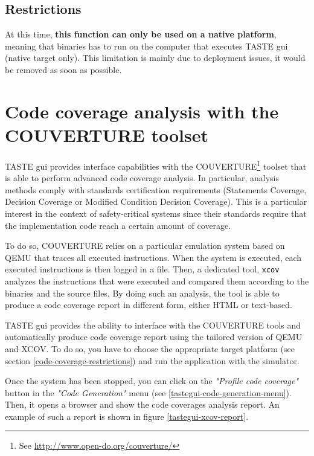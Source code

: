 \documentclass[11pt]{book}
\begin{document}
      \subsection{Restrictions}
      At this time, \textbf{this function can only be used on a native platform}, meaning
      that binaries has to run on the computer that executes TASTE gui (native
      target only). This limitation is mainly due to deployment issues, it would be removed as
      soon as possible.


   \section{Code coverage analysis with the COUVERTURE toolset}
   TASTE gui provides interface capabilities with the COUVERTURE\footnote{See \url{http://www.open-do.org/couverture/}} toolset that is
   able to perform advanced code coverage analysis. In particular, analysis
   methods comply with standards certification requirements (Statements
   Coverage, Decision Coverage or Modified Condition Decision Coverage). This is
   a particular interest in the context of safety-critical systems since their
   standards require that the implementation code reach a certain amount of
   coverage.

   To do so, COUVERTURE relies on a particular emulation system based on QEMU
   that traces all executed instructions. When the system is executed, each
   executed instructions is then logged in a file. Then, a dedicated tool,
   \texttt{xcov} analyzes the instructions that were executed and compared them
   according to the binaries and the source files. By doing such an analysis,
   the tool is able to produce a code coverage report in different form, either
   HTML or text-based.

   TASTE gui provides the ability to interface with the COUVERTURE tools and
   automatically produce code coverage report using the tailored version of QEMU
   and XCOV. To do so, you have to choose the appropriate target platform (see
   section \ref{code-coverage-restrictions}) and run the application with the
   simulator.

   Once the system has been stopped, you can click on the \textit{"Profile code
   coverage"} button in the \textit{"Code Generation"} menu (see
   \ref{tastegui-code-generation-menu}). Then, it opens a browser and 
   show the code coverages analysis report. An example of such a report is shown in figure
   \ref{tastegui-xcov-report}.
\end{document}
